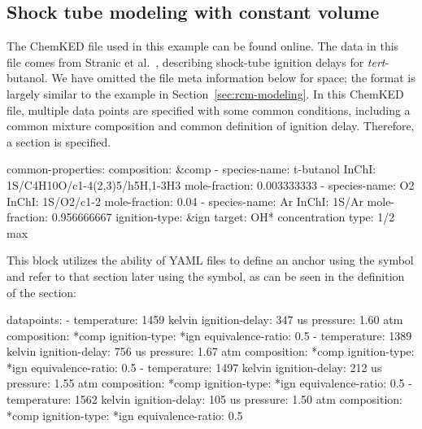 \documentclass[12pt]{ussci}
\newcommand\ck{ChemKED}
\begin{document}
\subsection{Shock tube modeling with constant volume}\label{sec:shock-tube}

The \ck{} file used in this example can be found online. The
data in this file comes from Stranic et al.~\autocite{Stranic:2012}, describing
shock-tube ignition delays for \textit{tert}-butanol. We have omitted the file
meta information below for space; the format is largely similar to the example in Section~\ref{sec:rcm-modeling}.
%
In this \ck{} file, multiple data points are specified with some common
conditions, including a common mixture composition and common definition of
ignition delay. Therefore, a  section is specified.
%
\begin{yamlbox}
common-properties:
  composition: &comp
    - species-name: t-butanol
      InChI: 1S/C4H10O/c1-4(2,3)5/h5H,1-3H3
      mole-fraction: 0.003333333
    - species-name: O2
      InChI:  1S/O2/c1-2
      mole-fraction: 0.04
    - species-name: Ar
      InChI:  1S/Ar
      mole-fraction: 0.956666667
  ignition-type:  &ign
    target: OH* concentration
    type: 1/2 max
\end{yamlbox}
%
This block utilizes the ability of YAML files to define an anchor using the
\yabox{&} symbol and refer to that section later using the \yabox{*} symbol, as
can be seen in the definition of the  section:
%
\begin{yamlbox}
datapoints:
  - temperature: 1459 kelvin
    ignition-delay: 347 us
    pressure: 1.60 atm
    composition: *comp
    ignition-type: *ign
    equivalence-ratio: 0.5
  - temperature: 1389 kelvin
    ignition-delay: 756 us
    pressure: 1.67 atm
    composition: *comp
    ignition-type: *ign
    equivalence-ratio: 0.5
  - temperature: 1497 kelvin
    ignition-delay: 212 us
    pressure: 1.55 atm
    composition: *comp
    ignition-type: *ign
    equivalence-ratio: 0.5
  - temperature: 1562 kelvin
    ignition-delay: 105 us
    pressure: 1.50 atm
    composition: *comp
    ignition-type: *ign
    equivalence-ratio: 0.5
\end{yamlbox}
\end{document}
